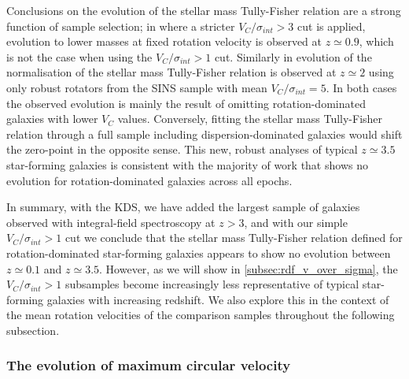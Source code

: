 \documentclass[fleqn,usenatbib]{mnras}
\begin{document}
\noindent
Conclusions on the evolution of the stellar mass Tully-Fisher relation are a strong function of sample selection; in \cite{Tiley2016} where a stricter $V_{C}/\sigma_{int} > 3$ cut is applied, evolution to lower masses at fixed rotation velocity is observed at $z\simeq0.9$, which is not the case when using the $V_{C}/\sigma_{int} > 1$ cut.
Similarly in \cite{Cresci2009} evolution of the normalisation of the stellar mass Tully-Fisher relation is observed at $z\simeq2$ using only robust rotators from the SINS sample with mean $V_{C}/\sigma_{int} = 5$.
In both cases the observed evolution is mainly the result of omitting rotation-dominated galaxies with lower $V_{C}$ values.
Conversely, fitting the stellar mass Tully-Fisher relation through a full sample including dispersion-dominated galaxies would shift the zero-point in the opposite sense.
This new, robust analyses of typical $z\simeq3.5$ star-forming galaxies is consistent with the majority of work that shows no evolution for rotation-dominated galaxies across all epochs.

\noindent
In summary, with the KDS, we have added the largest sample of galaxies observed with integral-field spectroscopy at $z>3$, and with our simple $V_{C}/\sigma_{int} > 1$ cut we conclude that the stellar mass Tully-Fisher relation defined for rotation-dominated star-forming galaxies appears to show no evolution between $z\simeq0.1$ and $z\simeq3.5$.
However, as we will show in \cref{subsec:rdf_v_over_sigma}, the $V_{C}/\sigma_{int} > 1$ subsamples become increasingly less representative of typical star-forming galaxies with increasing redshift.
We also explore this in the context of the mean rotation velocities of the comparison samples throughout the following subsection. 

\subsubsection{The evolution of maximum circular velocity}\label{subsubsec:v_evolution}
\end{document}
